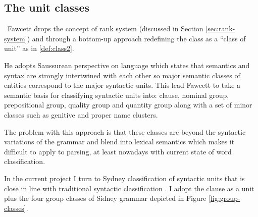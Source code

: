 \subsection{The unit classes}
\
Fawcett drops the concept of rank system (discussed in Section \ref{sec:rank-system}) and through a bottom-up approach redefining the class as a ``class of unit'' as in \ref{def:class2}.

He adopts Saussurean perspective on language which states that semantics and syntax are strongly intertwined with each other so major semantic classes of entities correspond to the major syntactic units. This lead Fawcett to take a semantic basis for classifying syntactic units into: clause, nominal group, prepositional group, quality group and quantity group \citep[193--194]{Fawcett2000} along with a set of minor classes such as genitive and proper name clusters. 

The problem with this approach is that these classes are beyond the syntactic variations of the grammar and blend into lexical semantics which makes it difficult to apply to parsing, at least nowadays with current state of word classification.   

In the current project I turn to Sydney classification of syntactic units that is close in line with traditional syntactic classification \citep{Quirk1985}. I adopt the clause as a unit plus the four group classes of Sidney grammar depicted in Figure \ref{fig:group-classes}.

